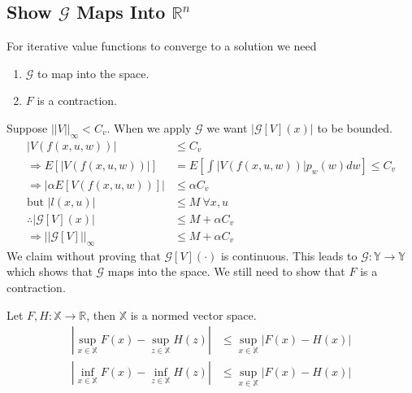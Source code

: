 \subsection{Show $\mathcal{G}$ Maps Into $\mathbb{R}^n$}
For iterative value functions to converge to a solution we need
\begin{enumerate}
\item $\mathcal{G}$ to map into the space.
\item $F$ is a contraction.
\end{enumerate}
Suppose $||V||_\infty<C_v$. When we apply $\mathcal{G}$ we want $|\mathcal{G}[V](x)|$ to be bounded.
\begin{align*}
|V(f(x,u,w))| &\leq C_v \\
\Rightarrow E[|V(f(x,u,w))|] &= E[\int|V(f(x,u,w))|p_w(w)dw] \leq C_v \\
\Rightarrow |\alpha E[V(f(x,u,w))]| &\leq \alpha C_v \\
\text{but } |l(x,u)| &\leq M ~\forall x,u \\
\therefore |\mathcal{G}[V](x)| &\leq M + \alpha C_v \\
\Rightarrow ||\mathcal{G}[V]||_\infty &\leq M + \alpha C_v
\end{align*}
We claim without proving that $\mathcal{G}[V](\cdot)$ is continuous. This leads to $\mathcal{G}:\mathbb{Y}\to\mathbb{Y}$ which shows that $\mathcal{G}$ maps into the space. We still need to show that $F$ is a contraction.

\begin{theorem}
\label{th:nvs}
Let $F,H:\mathbb{X}\to\mathbb{R}$, then $\mathbb{X}$ is a normed vector space.
\begin{align*}
|\sup_{x\in\mathbb{X}}F(x) - \sup_{z\in\mathbb{X}}H(z)| &\leq \sup_{x\in\mathbb{X}}|F(x)-H(x)| \\
|\inf_{x\in\mathbb{X}}F(x) - \inf_{z\in\mathbb{X}}H(z)| &\leq \sup_{x\in\mathbb{X}}|F(x)-H(x)|
\end{align*}
\end{theorem}

